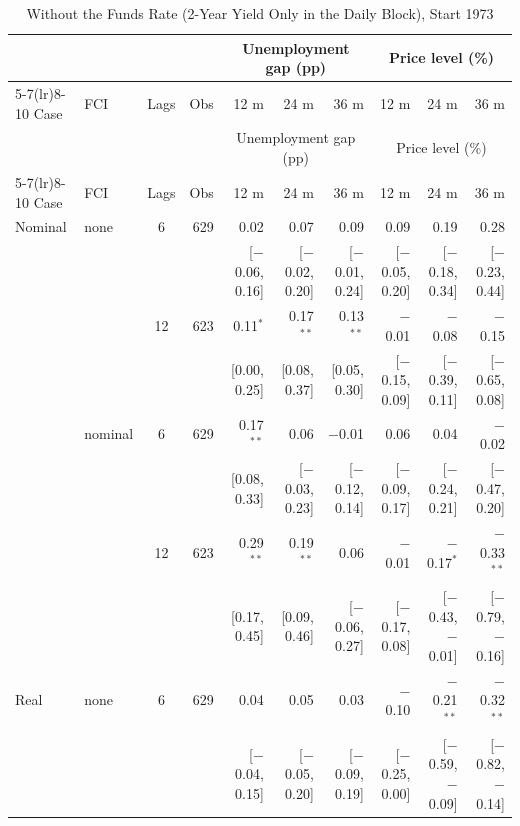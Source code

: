 \begingroup\scriptsize\setlength{\tabcolsep}{0.9pt}
\begin{longtable}{llcrrrrrrr}
\caption{Without the Funds Rate (2-Year Yield Only in the Daily Block), Start 1973}\label{tab:appR573}\\
\toprule
 & & & & \multicolumn{3}{c}{Unemployment gap (pp)} & \multicolumn{3}{c}{Price level (\%)}\\ \cmidrule(lr){5-7}\cmidrule(lr){8-10}
Case & FCI & Lags & Obs & 12 m & 24 m & 36 m & 12 m & 24 m & 36 m\\
\midrule\endfirsthead
\toprule
 & & & & \multicolumn{3}{c}{Unemployment gap (pp)} & \multicolumn{3}{c}{Price level (\%)}\\ \cmidrule(lr){5-7}\cmidrule(lr){8-10}
Case & FCI & Lags & Obs & 12 m & 24 m & 36 m & 12 m & 24 m & 36 m\\
\midrule\endhead
\bottomrule\endfoot
Nominal & none & 6 & 629 & 0.02 & 0.07 & 0.09 & 0.09 & 0.19 & 0.28\\
 & & & & {\scriptsize [$-$0.06, 0.16]} & {\scriptsize [$-$0.02, 0.20]} & {\scriptsize [$-$0.01, 0.24]} & {\scriptsize [$-$0.05, 0.20]} & {\scriptsize [$-$0.18, 0.34]} & {\scriptsize [$-$0.23, 0.44]}\\
 &  & 12 & 623 & 0.11$^{*}$ & 0.17$^{**}$ & 0.13$^{**}$ & $-$0.01 & $-$0.08 & $-$0.15\\
 & & & & {\scriptsize [0.00, 0.25]} & {\scriptsize [0.08, 0.37]} & {\scriptsize [0.05, 0.30]} & {\scriptsize [$-$0.15, 0.09]} & {\scriptsize [$-$0.39, 0.11]} & {\scriptsize [$-$0.65, 0.08]}\\
 & nominal & 6 & 629 & 0.17$^{**}$ & 0.06 & $-$0.01 & 0.06 & 0.04 & $-$0.02\\
 & & & & {\scriptsize [0.08, 0.33]} & {\scriptsize [$-$0.03, 0.23]} & {\scriptsize [$-$0.12, 0.14]} & {\scriptsize [$-$0.09, 0.17]} & {\scriptsize [$-$0.24, 0.21]} & {\scriptsize [$-$0.47, 0.20]}\\
 &  & 12 & 623 & 0.29$^{**}$ & 0.19$^{**}$ & 0.06 & $-$0.01 & $-$0.17$^{*}$ & $-$0.33$^{**}$\\
 & & & & {\scriptsize [0.17, 0.45]} & {\scriptsize [0.09, 0.46]} & {\scriptsize [$-$0.06, 0.27]} & {\scriptsize [$-$0.17, 0.08]} & {\scriptsize [$-$0.43, $-$0.01]} & {\scriptsize [$-$0.79, $-$0.16]}\\
\addlinespace
Real & none & 6 & 629 & 0.04 & 0.05 & 0.03 & $-$0.10 & $-$0.21$^{**}$ & $-$0.32$^{**}$\\
 & & & & {\scriptsize [$-$0.04, 0.15]} & {\scriptsize [$-$0.05, 0.20]} & {\scriptsize [$-$0.09, 0.19]} & {\scriptsize [$-$0.25, 0.00]} & {\scriptsize [$-$0.59, $-$0.09]} & {\scriptsize [$-$0.82, $-$0.14]}\\

\end{longtable}
